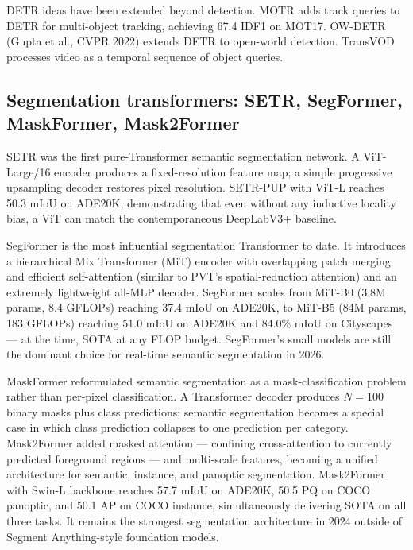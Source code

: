 \documentclass{article}
\begin{document}
DETR ideas have been extended beyond detection. MOTR \citep{zeng2022motrendtoendmultip} adds track queries to DETR for multi-object tracking, achieving 67.4 IDF1 on MOT17. OW-DETR (Gupta et al., CVPR 2022) extends DETR to open-world detection. TransVOD \citep{zhou2023afoundationmodelfo} processes video as a temporal sequence of object queries.

\subsection{Segmentation transformers: SETR, SegFormer, MaskFormer, Mask2Former}\label{segmentation-transformers-setr-segformer-maskformer-mask2former}

SETR \citep{zheng2021rethinkingsemantic} was the first pure-Transformer semantic segmentation network. A ViT-Large/16 encoder produces a fixed-resolution feature map; a simple progressive upsampling decoder restores pixel resolution. SETR-PUP with ViT-L reaches 50.3 mIoU on ADE20K, demonstrating that even without any inductive locality bias, a ViT can match the contemporaneous DeepLabV3+ baseline.

SegFormer \citep{xie2021segformersimpleand} is the most influential segmentation Transformer to date. It introduces a hierarchical Mix Transformer (MiT) encoder with overlapping patch merging and efficient self-attention (similar to PVT's spatial-reduction attention) and an extremely lightweight all-MLP decoder. SegFormer scales from MiT-B0 (3.8M params, 8.4 GFLOPs) reaching 37.4 mIoU on ADE20K, to MiT-B5 (84M params, 183 GFLOPs) reaching 51.0 mIoU on ADE20K and 84.0\% mIoU on Cityscapes --- at the time, SOTA at any FLOP budget. SegFormer's small models are still the dominant choice for real-time semantic segmentation in 2026.

MaskFormer \citep{cheng2021perpixelclassifica} reformulated semantic segmentation as a mask-classification problem rather than per-pixel classification. A Transformer decoder produces \(N=100\) binary masks plus class predictions; semantic segmentation becomes a special case in which class prediction collapses to one prediction per category. Mask2Former \citep{cheng2022maskedattentionmas} added masked attention --- confining cross-attention to currently predicted foreground regions --- and multi-scale features, becoming a unified architecture for semantic, instance, and panoptic segmentation. Mask2Former with Swin-L backbone reaches 57.7 mIoU on ADE20K, 50.5 PQ on COCO panoptic, and 50.1 AP on COCO instance, simultaneously delivering SOTA on all three tasks. It remains the strongest segmentation architecture in 2024 outside of Segment Anything-style foundation models.
\end{document}
